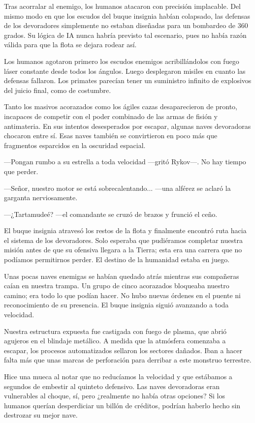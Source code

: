 Tras acorralar al enemigo, los humanos atacaron con precisión implacable. Del mismo modo en que los escudos del buque insignia habían colapsado, las defensas de los devoradores simplemente no estaban diseñadas para un bombardeo de 360 grados. Su lógica de IA nunca habría previsto tal escenario, pues no había razón válida para que la flota se dejara rodear así.

Los humanos agotaron primero los escudos enemigos acribillándolos con fuego láser constante desde todos los ángulos. Luego desplegaron misiles en cuanto las defensas fallaron. Los primates parecían tener un suministro infinito de explosivos del juicio final, como de costumbre.

Tanto los masivos acorazados como los ágiles cazas desaparecieron de pronto, incapaces de competir con el poder combinado de las armas de fisión y antimateria. En sus intentos desesperados por escapar, algunas naves devoradoras chocaron entre sí. Esas naves también se convirtieron en poco más que fragmentos esparcidos en la oscuridad espacial.

—Pongan rumbo a su estrella a toda velocidad —gritó Rykov—. No hay tiempo que perder.

—Señor, nuestro motor se está sobrecalentando... —una alférez se aclaró la garganta nerviosamente.

 —¿Tartamudeé? —el comandante se cruzó de brazos y frunció el ceño.

El buque insignia atravesó los restos de la flota y finalmente encontró ruta hacia el sistema de los devoradores. Solo esperaba que pudiéramos completar nuestra misión antes de que su ofensiva llegara a la Tierra; esta era una carrera que no podíamos permitirnos perder. El destino de la humanidad estaba en juego.

Unas pocas naves enemigas se habían quedado atrás mientras sus compañeras caían en nuestra trampa. Un grupo de cinco acorazados bloqueaba nuestro camino; era todo lo que podían hacer. No hubo nuevas órdenes en el puente ni reconocimiento de su presencia. El buque insignia siguió avanzando a toda velocidad.

Nuestra estructura expuesta fue castigada con fuego de plasma, que abrió agujeros en el blindaje metálico. A medida que la atmósfera comenzaba a escapar, los procesos automatizados sellaron los sectores dañados. Iban a hacer falta más que unas marcas de perforación para derribar a este monstruo terrestre.

Hice una mueca al notar que no reducíamos la velocidad y que estábamos a segundos de embestir al quinteto defensivo. Las naves devoradoras eran vulnerables al choque, sí, pero ¿realmente no había otras opciones? Si los humanos querían desperdiciar un billón de créditos, podrían haberlo hecho sin destrozar su mejor nave.

